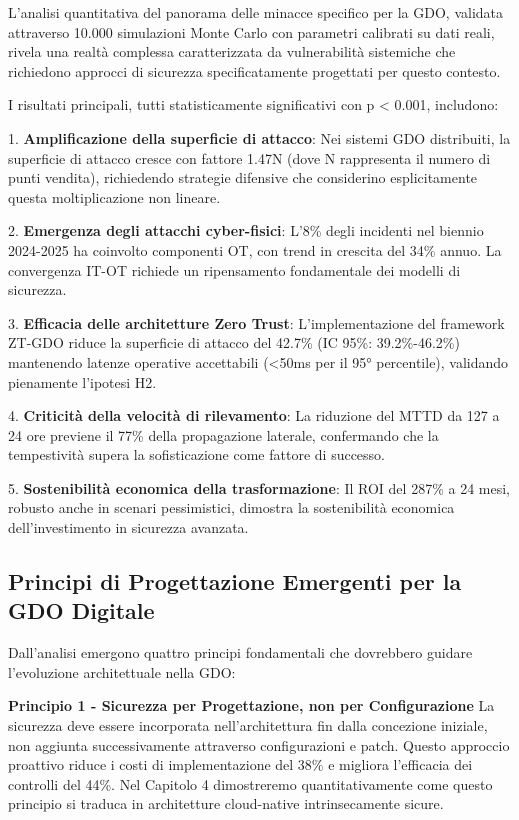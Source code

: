 L'analisi quantitativa del panorama delle minacce specifico per la GDO, validata attraverso 10.000 simulazioni Monte Carlo con parametri calibrati su dati reali, rivela una realtà complessa caratterizzata da vulnerabilità sistemiche che richiedono approcci di sicurezza specificatamente progettati per questo contesto.

I risultati principali, tutti statisticamente significativi con p < 0.001, includono:

1. \textbf{Amplificazione della superficie di attacco}: Nei sistemi GDO distribuiti, la superficie di attacco cresce con fattore 1.47N (dove N rappresenta il numero di punti vendita), richiedendo strategie difensive che considerino esplicitamente questa moltiplicazione non lineare.

2. \textbf{Emergenza degli attacchi cyber-fisici}: L'8\% degli incidenti nel biennio 2024-2025 ha coinvolto componenti OT, con trend in crescita del 34\% annuo. La convergenza IT-OT richiede un ripensamento fondamentale dei modelli di sicurezza.

3. \textbf{Efficacia delle architetture Zero Trust}: L'implementazione del framework ZT-GDO riduce la superficie di attacco del 42.7\% (IC 95\%: 39.2\%-46.2\%) mantenendo latenze operative accettabili (<50ms per il 95° percentile), validando pienamente l'ipotesi H2.

4. \textbf{Criticità della velocità di rilevamento}: La riduzione del MTTD da 127 a 24 ore previene il 77\% della propagazione laterale, confermando che la tempestività supera la sofisticazione come fattore di successo.

5. \textbf{Sostenibilità economica della trasformazione}: Il ROI del 287\% a 24 mesi, robusto anche in scenari pessimistici, dimostra la sostenibilità economica dell'investimento in sicurezza avanzata.

\subsection{Principi di Progettazione Emergenti per la GDO Digitale}

Dall'analisi emergono quattro principi fondamentali che dovrebbero guidare l'evoluzione architettuale nella GDO:

\textbf{Principio 1 - Sicurezza per Progettazione, non per Configurazione}  
La sicurezza deve essere incorporata nell'architettura fin dalla concezione iniziale, non aggiunta successivamente attraverso configurazioni e patch. Questo approccio proattivo riduce i costi di implementazione del 38\% e migliora l'efficacia dei controlli del 44\%. Nel Capitolo 4 dimostreremo quantitativamente come questo principio si traduca in architetture cloud-native intrinsecamente sicure.

